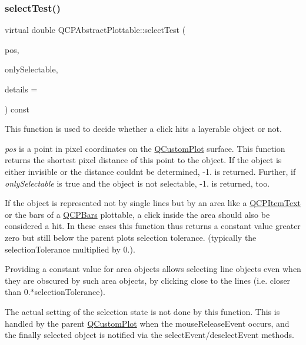 \mbox{\label{class_q_c_p_abstract_plottable_a38efe9641d972992a3d44204bc80ec1d}} 
\subsubsection{\texorpdfstring{select\+Test()}{selectTest()}\hspace{0.1cm}{\footnotesize\ttfamily [2/2]}}
{\footnotesize\ttfamily virtual double Q\+C\+P\+Abstract\+Plottable\+::select\+Test (\begin{DoxyParamCaption}\item[{const Q\+PointF \&}]{pos,  }\item[{bool}]{only\+Selectable,  }\item[{Q\+Variant $\ast$}]{details = {} }\end{DoxyParamCaption}) const\hspace{0.3cm}{\ttfamily [pure virtual]}}

This function is used to decide whether a click hits a layerable object or not.

{\itshape pos} is a point in pixel coordinates on the \hyperlink{class_q_custom_plot}{Q\+Custom\+Plot} surface. This function returns the shortest pixel distance of this point to the object. If the object is either invisible or the distance couldn\textquotesingle{}t be determined, -\/1. is returned. Further, if {\itshape only\+Selectable} is true and the object is not selectable, -\/1. is returned, too.

If the object is represented not by single lines but by an area like a \hyperlink{class_q_c_p_item_text}{Q\+C\+P\+Item\+Text} or the bars of a \hyperlink{class_q_c_p_bars}{Q\+C\+P\+Bars} plottable, a click inside the area should also be considered a hit. In these cases this function thus returns a constant value greater zero but still below the parent plot\textquotesingle{}s selection tolerance. (typically the selection\+Tolerance multiplied by 0.).

Providing a constant value for area objects allows selecting line objects even when they are obscured by such area objects, by clicking close to the lines (i.\+e. closer than 0.$\ast$selection\+Tolerance).

The actual setting of the selection state is not done by this function. This is handled by the parent \hyperlink{class_q_custom_plot}{Q\+Custom\+Plot} when the mouse\+Release\+Event occurs, and the finally selected object is notified via the select\+Event/deselect\+Event methods.

